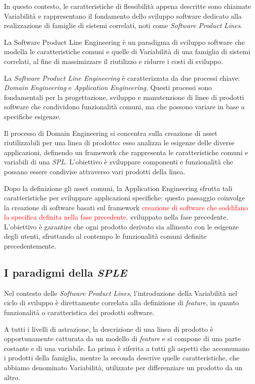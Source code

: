 \documentclass[12pt]{report}
\newcommand{\torevise}[1]{\textcolor{red}{#1}}
\newcommand{\sple}{\textsl{SPLE}\xspace}
\newcommand{\spl}{\textsl{SPL}\xspace}
\begin{document}
In questo contesto, le caratteristiche di flessibilità appena descritte sono chiamate Variabilità e rappresentano il fondamento dello sviluppo software dedicato alla realizzazione di famiglie di sistemi correlati, noti come \textit{Software Product Lines}.

\begin{mdframed}
\small
La \textsf{Software Product Line Engineering} è un paradigma di sviluppo software che modella le caratteristiche comuni e quelle di Variabilità di una famiglia di sistemi correlati, al fine di massimizzare il riutilizzo e ridurre i costi di sviluppo.
\end{mdframed}

La \textit{Software Product Line Engineering} è caratterizzata da due processi chiave: \textit{Domain Engineering} e \textit{Application Engineering}. Questi processi sono fondamentali per la progettazione, sviluppo e manutenzione di linee di prodotti software che condividono funzionalità comuni, ma che possono variare in base a specifiche esigenze.

Il processo di \textsf{Domain Engineering} si concentra sulla creazione di asset riutilizzabili per una linea di prodotto: esso analizza le esigenze delle diverse applicazioni, definendo un framework che rappresenta le caratteristiche comuni e variabili di una \spl. L'obiettivo è sviluppare componenti e funzionalità che possano essere condivise attraverso vari prodotti della linea.

Dopo la definizione gli asset comuni, la \textsf{Application Engineering} sfrutta tali caratteristiche per sviluppare applicazioni specifiche: questo passaggio coinvolge la creazione di software basati sul framework \torevise{creazione di software che soddifano la specifica definita nella fase precedente.} sviluppato nella fase precedente. L'obiettivo è garantire che ogni prodotto derivato sia allineato con le esigenze degli utenti, sfruttando al contempo le funzionalità comuni definite precedentemente.




\subsection{I paradigmi della \sple}
Nel contesto delle \textit{Software Product Lines}, l'introduzione della Variabilità nel ciclo di sviluppo è direttamente correlata alla definizione di \textit{feature}, in quanto funzionalità o caratteristica dei prodotti software.

A tutti i livelli di astrazione, la descrizione di una linea di prodotto è opportunamente catturata da un modello di \textit{feature} e si compone di una parte costante e di una variabile. La prima è riferita a tutti gli aspetti che accomunano i prodotti della famiglia, mentre la seconda descrive quelle caratteristiche, che abbiamo denominato Variabilità, utilizzate per differenziare un prodotto da un altro.
\end{document}
